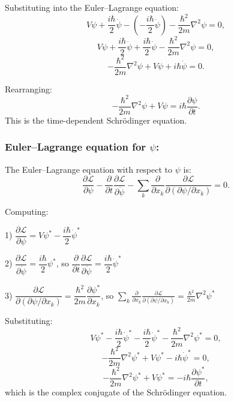 \documentclass[12pt]{article}
\begin{document}
Substituting into the Euler--Lagrange equation:
\[
  V\psi + \frac{i\hbar}{2}\dot{\psi} - \left(-\frac{i\hbar}{2}\dot{\psi}\right) - \frac{\hbar^2}{2m}\nabla^2\psi = 0,
\]
\[
  V\psi + \frac{i\hbar}{2}\dot{\psi} + \frac{i\hbar}{2}\dot{\psi} - \frac{\hbar^2}{2m}\nabla^2\psi = 0,
\]
\[
  -\frac{\hbar^2}{2m}\nabla^2\psi + V\psi + i\hbar\dot{\psi} = 0.
\]

Rearranging:
\[
  \boxed{-\frac{\hbar^2}{2m}\nabla^2\psi + V\psi = i\hbar\frac{\partial\psi}{\partial t}.}
\]
This is the time-dependent Schr\"odinger equation.

\subsubsection*{Euler--Lagrange equation for $\psi$:}

The Euler--Lagrange equation with respect to $\psi$ is:
\[
  \frac{\partial\mathscr{L}}{\partial\psi}
  - \frac{\partial}{\partial t}\frac{\partial\mathscr{L}}{\partial\dot{\psi}}
  - \sum_k \frac{\partial}{\partial x_k}\frac{\partial\mathscr{L}}{\partial(\partial\psi/\partial x_k)}
  = 0.
\]

Computing:

1) $\dfrac{\partial\mathscr{L}}{\partial\psi} = V\psi^* - \dfrac{i\hbar}{2}\dot{\psi}^*$

2) $\dfrac{\partial\mathscr{L}}{\partial\dot{\psi}} = \dfrac{i\hbar}{2}\psi^*$, so $\dfrac{\partial}{\partial t}\dfrac{\partial\mathscr{L}}{\partial\dot{\psi}} = \dfrac{i\hbar}{2}\dot{\psi}^*$

3) $\dfrac{\partial\mathscr{L}}{\partial(\partial\psi/\partial x_k)} = \dfrac{\hbar^2}{2m}\dfrac{\partial\psi^*}{\partial x_k}$, so $\displaystyle\sum_k \frac{\partial}{\partial x_k}\frac{\partial\mathscr{L}}{\partial(\partial\psi/\partial x_k)} = \frac{\hbar^2}{2m}\nabla^2\psi^*$

Substituting:
\[
  V\psi^* - \frac{i\hbar}{2}\dot{\psi}^* - \frac{i\hbar}{2}\dot{\psi}^* - \frac{\hbar^2}{2m}\nabla^2\psi^* = 0,
\]
\[
  -\frac{\hbar^2}{2m}\nabla^2\psi^* + V\psi^* - i\hbar\dot{\psi}^* = 0,
\]
\[
  \boxed{-\frac{\hbar^2}{2m}\nabla^2\psi^* + V\psi^* = -i\hbar\frac{\partial\psi^*}{\partial t},}
\]
which is the complex conjugate of the Schr\"odinger equation.
\end{document}
